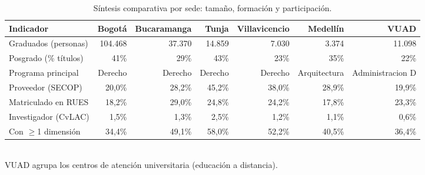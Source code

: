 \begin{table}[H]\centering\scriptsize
\caption{Síntesis comparativa por sede: tamaño, formación y participación.}
\label{tab:seccional_sintesis}
\begin{tabular}{lrrrrrr}
\toprule
\rowcolor{ustaazul}\textbf{\color{white}Indicador} & \textbf{\color{white}Bogotá} & \textbf{\color{white}Bucaramanga} & \textbf{\color{white}Tunja} & \textbf{\color{white}Villavicencio} & \textbf{\color{white}Medellín} & \textbf{\color{white}VUAD} \\
\midrule
Graduados (personas) & 104.468 & 37.370 & 14.859 & 7.030 & 3.374 & 11.098 \\
Posgrado (\% títulos) & 41\% & 29\% & 43\% & 23\% & 35\% & 22\% \\
Programa principal & Derecho & Derecho & Derecho & Derecho & Arquitectura & Administracion D \\
Proveedor (SECOP) & 20,0\% & 28,2\% & 45,2\% & 38,0\% & 28,9\% & 19,9\% \\
Matriculado en RUES & 18,2\% & 29,0\% & 24,8\% & 24,2\% & 17,8\% & 23,3\% \\
Investigador (CvLAC) & 1,5\% & 1,3\% & 2,5\% & 1,2\% & 1,1\% & 0,6\% \\
Con $\geq$1 dimensión & 34,4\% & 49,1\% & 58,0\% & 52,2\% & 40,5\% & 36,4\% \\
\bottomrule
\end{tabular}
\\[2pt]{\scriptsize\color{ustagris} VUAD agrupa los centros de atención universitaria (educación a distancia).}
\end{table}